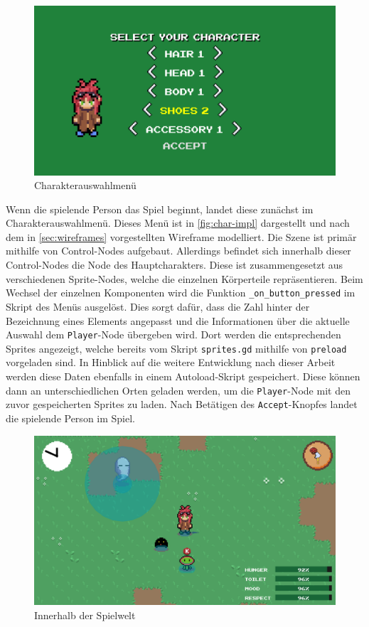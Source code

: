 \begin{figure}[H]
\centering
\includegraphics[width=0.8\columnwidth]{figures/screenshots/charselect.png}
\caption{\label{fig:char-impl}Charakterauswahlmenü}
\end{figure}

Wenn die spielende Person das Spiel beginnt, landet diese zunächst im Charakterauswahlmenü. Dieses Menü ist in \autoref{fig:char-impl} dargestellt und nach dem in \autoref{sec:wireframes} vorgestellten Wireframe modelliert. Die Szene ist primär mithilfe von Control-Nodes aufgebaut. Allerdings befindet sich innerhalb dieser Control-Nodes die Node des Hauptcharakters. Diese ist zusammengesetzt aus verschiedenen Sprite-Nodes, welche die einzelnen Körperteile repräsentieren. Beim Wechsel der einzelnen Komponenten wird die Funktion \texttt{\_on\_button\_pressed} im Skript des Menüs ausgelöst. Dies sorgt dafür, dass die Zahl hinter der Bezeichnung eines Elements angepasst und die Informationen über die aktuelle Auswahl dem \texttt{Player}-Node übergeben wird. Dort werden die entsprechenden Sprites angezeigt, welche bereits vom Skript \texttt{sprites.gd} mithilfe von \texttt{preload} vorgeladen sind. In Hinblick auf die weitere Entwicklung nach dieser Arbeit werden diese Daten ebenfalls in einem Autoload-Skript gespeichert. Diese können dann an unterschiedlichen Orten geladen werden, um die \texttt{Player}-Node mit den zuvor gespeicherten Sprites zu laden. Nach Betätigen des \texttt{Accept}-Knopfes landet die spielende Person im Spiel. \\

\begin{figure}[H]
\centering
\includegraphics[width=0.8\columnwidth]{figures/screenshots/ingame.png}
\caption{\label{fig:ingame}Innerhalb der Spielwelt}
\end{figure}

